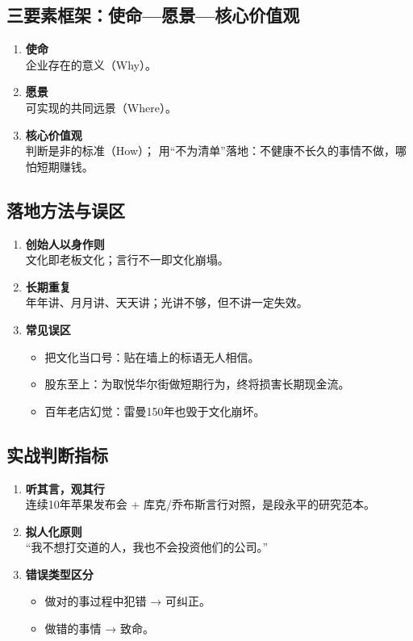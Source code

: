 \subsection{三要素框架：使命—愿景—核心价值观}
\begin{enumerate}[leftmargin=*, nosep]
    \item \textbf{使命}  \\
    企业存在的意义（Why）。
    \item \textbf{愿景}  \\
    可实现的共同远景（Where）。
    \item \textbf{核心价值观}  \\
    判断是非的标准（How）；  
    用“不为清单”落地：不健康不长久的事情不做，哪怕短期赚钱。
\end{enumerate}

\subsection{落地方法与误区}
\begin{enumerate}[leftmargin=*, nosep]
    \item \textbf{创始人以身作则}  \\
    文化即老板文化；言行不一即文化崩塌。
    \item \textbf{长期重复}  \\
    年年讲、月月讲、天天讲；光讲不够，但不讲一定失效。
    \item \textbf{常见误区}  \\
    \begin{itemize}[nosep]
        \item 把文化当口号：贴在墙上的标语无人相信。  
        \item 股东至上：为取悦华尔街做短期行为，终将损害长期现金流。  
        \item 百年老店幻觉：雷曼150年也毁于文化崩坏。
    \end{itemize}
\end{enumerate}

\subsection{实战判断指标}
\begin{enumerate}[leftmargin=*, nosep]
    \item \textbf{听其言，观其行}  \\
    连续10年苹果发布会 + 库克/乔布斯言行对照，是段永平的研究范本。
    \item \textbf{拟人化原则}  \\
    “我不想打交道的人，我也不会投资他们的公司。”
    \item \textbf{错误类型区分}  \\
    \begin{itemize}[nosep]
        \item 做对的事过程中犯错 → 可纠正。  
        \item 做错的事情 → 致命。
    \end{itemize}
\end{enumerate}

